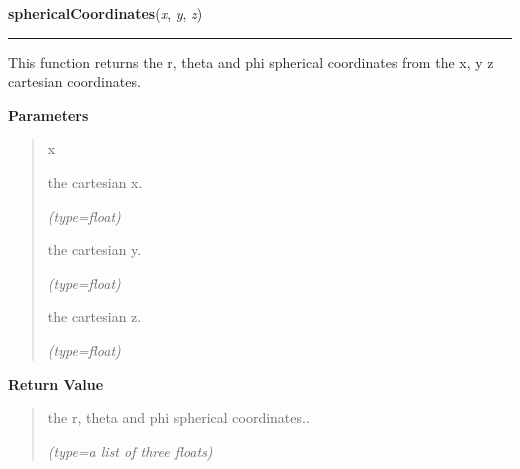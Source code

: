     \label{nMOLDYN:Core:Mathematics:sphericalCoordinates}

    \vspace{0.5ex}

\hspace{.8\funcindent}\begin{boxedminipage}{\funcwidth}

    \raggedright \textbf{sphericalCoordinates}(\textit{x}, \textit{y}, \textit{z})

    \vspace{-1.5ex}

    \rule{\textwidth}{0.5\fboxrule}
\setlength{\parskip}{2ex}
    This function returns the r, theta and phi spherical coordinates from 
    the x, y z cartesian coordinates.

\setlength{\parskip}{1ex}
      \textbf{Parameters}
      \vspace{-1ex}

      \begin{quote}
        \begin{Ventry}{x}

          \item[x]

          the cartesian x.

            {\it (type=float)}

          \item[y]

          the cartesian y.

            {\it (type=float)}

          \item[z]

          the cartesian z.

            {\it (type=float)}

        \end{Ventry}

      \end{quote}

      \textbf{Return Value}
    \vspace{-1ex}

      \begin{quote}
      the r, theta and phi spherical coordinates..

      {\it (type=a list of three floats)}

      \end{quote}

    \end{boxedminipage}

